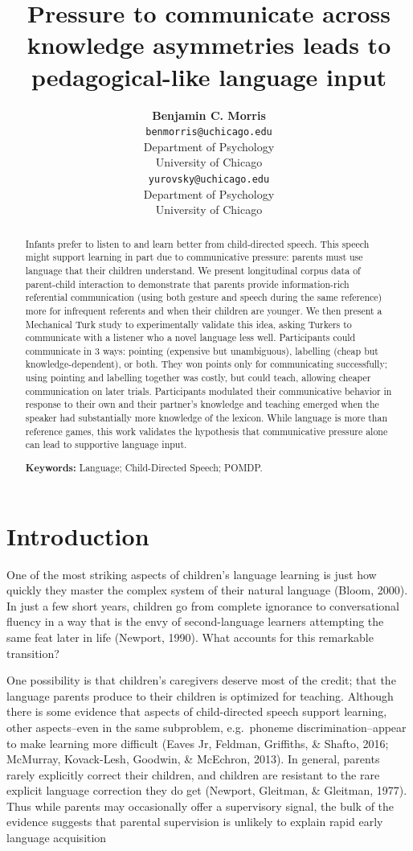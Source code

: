 \documentclass[10pt, letterpaper]{article}
\title{Pressure to communicate across knowledge asymmetries leads to
pedagogical-like language input}
\author{{\large \bf Benjamin C. Morris} \\ \texttt{benmorris@uchicago.edu} \\ Department of Psychology \\ University of Chicago \And {\large \bf Daniel Yurovsky} \\ \texttt{yurovsky@uchicago.edu} \\ Department of Psychology \\ University of Chicago}
\begin{document}
\maketitle

\begin{abstract}
Infants prefer to listen to and learn better from child-directed speech.
This speech might support learning in part due to communicative
pressure: parents must use language that their children understand. We
present longitudinal corpus data of parent-child interaction to
demonstrate that parents provide information-rich referential
communication (using both gesture and speech during the same reference)
more for infrequent referents and when their children are younger. We
then present a Mechanical Turk study to experimentally validate this
idea, asking Turkers to communicate with a listener who a novel language
less well. Participants could communicate in 3 ways: pointing (expensive
but unambiguous), labelling (cheap but knowledge-dependent), or both.
They won points only for communicating successfully; using pointing and
labelling together was costly, but could teach, allowing cheaper
communication on later trials. Participants modulated their
communicative behavior in response to their own and their partner's
knowledge and teaching emerged when the speaker had substantially more
knowledge of the lexicon. While language is more than reference games,
this work validates the hypothesis that communicative pressure alone can
lead to supportive language input.

\textbf{Keywords:}
Language; Child-Directed Speech; POMDP.
\end{abstract}

\hypertarget{introduction}{%
\section{Introduction}\label{introduction}}

One of the most striking aspects of children's language learning is just
how quickly they master the complex system of their natural language
(Bloom, 2000). In just a few short years, children go from complete
ignorance to conversational fluency in a way that is the envy of
second-language learners attempting the same feat later in life
(Newport, 1990). What accounts for this remarkable transition?

One possibility is that children's caregivers deserve most of the
credit; that the language parents produce to their children is optimized
for teaching. Although there is some evidence that aspects of
child-directed speech support learning, other aspects--even in the same
subproblem, e.g.~phoneme discrimination--appear to make learning more
difficult (Eaves Jr, Feldman, Griffiths, \& Shafto, 2016; McMurray,
Kovack-Lesh, Goodwin, \& McEchron, 2013). In general, parents rarely
explicitly correct their children, and children are resistant to the
rare explicit language correction they do get (Newport, Gleitman, \&
Gleitman, 1977). Thus while parents may occasionally offer a supervisory
signal, the bulk of the evidence suggests that parental supervision is
unlikely to explain rapid early language acquisition
\end{document}
